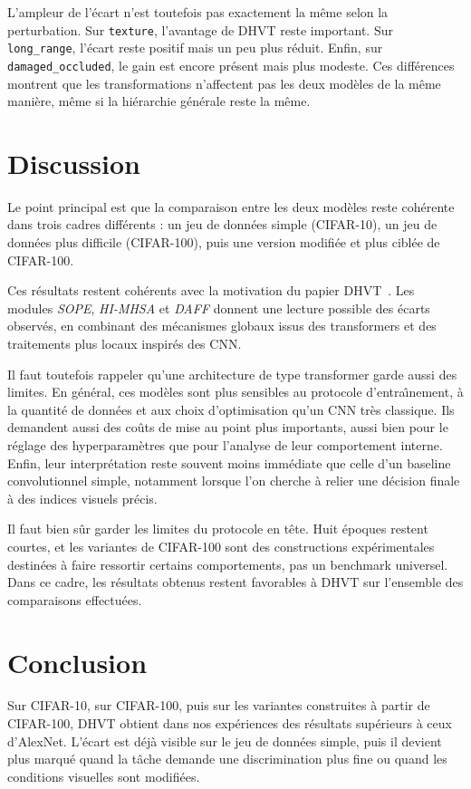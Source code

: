 \documentclass[11pt,a4paper]{article}
\begin{document}
L'ampleur de l'\'ecart n'est toutefois pas exactement la m\^eme selon la perturbation. Sur \texttt{texture}, l'avantage de DHVT reste important. Sur \texttt{long\_range}, l'\'ecart reste positif mais un peu plus r\'eduit. Enfin, sur \texttt{damaged\_occluded}, le gain est encore pr\'esent mais plus modeste. Ces diff\'erences montrent que les transformations n'affectent pas les deux mod\`eles de la m\^eme mani\`ere, m\^eme si la hi\'erarchie g\'en\'erale reste la m\^eme.

\section{Discussion}
Le point principal est que la comparaison entre les deux mod\`eles reste coh\'erente dans trois cadres diff\'erents : un jeu de donn\'ees simple (CIFAR-10), un jeu de donn\'ees plus difficile (CIFAR-100), puis une version modifi\'ee et plus cibl\'ee de CIFAR-100.

Ces r\'esultats restent coh\'erents avec la motivation du papier DHVT~\cite{dhvt}. Les modules \textit{SOPE}, \textit{HI-MHSA} et \textit{DAFF} donnent une lecture possible des \'ecarts observ\'es, en combinant des m\'ecanismes globaux issus des transformers et des traitements plus locaux inspir\'es des CNN.

Il faut toutefois rappeler qu'une architecture de type transformer garde aussi des limites. En g\'en\'eral, ces mod\`eles sont plus sensibles au protocole d'entra\^\i nement, \`a la quantit\'e de donn\'ees et aux choix d'optimisation qu'un CNN tr\`es classique. Ils demandent aussi des co\^uts de mise au point plus importants, aussi bien pour le r\'eglage des hyperparam\`etres que pour l'analyse de leur comportement interne. Enfin, leur interpr\'etation reste souvent moins imm\'ediate que celle d'un baseline convolutionnel simple, notamment lorsque l'on cherche \`a relier une d\'ecision finale \`a des indices visuels pr\'ecis.

Il faut bien s\^ur garder les limites du protocole en t\^ete. Huit \'epoques restent courtes, et les variantes de CIFAR-100 sont des constructions exp\'erimentales destin\'ees \`a faire ressortir certains comportements, pas un benchmark universel. Dans ce cadre, les r\'esultats obtenus restent favorables \`a DHVT sur l'ensemble des comparaisons effectu\'ees.

\section{Conclusion}
Sur CIFAR-10, sur CIFAR-100, puis sur les variantes construites \`a partir de CIFAR-100, DHVT obtient dans nos exp\'eriences des r\'esultats sup\'erieurs \`a ceux d'AlexNet. L'\'ecart est d\'ej\`a visible sur le jeu de donn\'ees simple, puis il devient plus marqu\'e quand la t\^ache demande une discrimination plus fine ou quand les conditions visuelles sont modifi\'ees.
\end{document}
